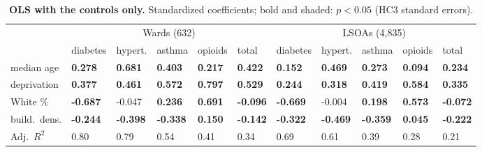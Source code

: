 \begin{table}[hbt!]
\caption{\textbf{OLS with the controls only.} Standardized coefficients; bold and shaded: $p<0.05$ (HC3 standard errors).}\label{ols_baseline}
\centering\footnotesize\setlength{\tabcolsep}{3pt}
\begin{tabular}{l*{10}{l}}
\toprule
 & \multicolumn{5}{c}{Wards (632)} & \multicolumn{5}{c}{LSOAs (4,835)} \\
\cmidrule(lr){2-6}\cmidrule(lr){7-11}
 & diabetes & hypert. & asthma & opioids & total & diabetes & hypert. & asthma & opioids & total \\
\midrule
median age & \cellcolor{poscell}\textbf{\phantom{-}0.278} & \cellcolor{poscell}\textbf{\phantom{-}0.681} & \cellcolor{poscell}\textbf{\phantom{-}0.403} & \cellcolor{poscell}\textbf{\phantom{-}0.217} & \cellcolor{poscell}\textbf{\phantom{-}0.422} & \cellcolor{poscell}\textbf{\phantom{-}0.152} & \cellcolor{poscell}\textbf{\phantom{-}0.469} & \cellcolor{poscell}\textbf{\phantom{-}0.273} & \cellcolor{poscell}\textbf{\phantom{-}0.094} & \cellcolor{poscell}\textbf{\phantom{-}0.234} \\
deprivation & \cellcolor{poscell}\textbf{\phantom{-}0.377} & \cellcolor{poscell}\textbf{\phantom{-}0.461} & \cellcolor{poscell}\textbf{\phantom{-}0.572} & \cellcolor{poscell}\textbf{\phantom{-}0.797} & \cellcolor{poscell}\textbf{\phantom{-}0.529} & \cellcolor{poscell}\textbf{\phantom{-}0.244} & \cellcolor{poscell}\textbf{\phantom{-}0.318} & \cellcolor{poscell}\textbf{\phantom{-}0.419} & \cellcolor{poscell}\textbf{\phantom{-}0.584} & \cellcolor{poscell}\textbf{\phantom{-}0.335} \\
White \% & \cellcolor{negcell}\textbf{-0.687} & -0.047 & \cellcolor{poscell}\textbf{\phantom{-}0.236} & \cellcolor{poscell}\textbf{\phantom{-}0.691} & \cellcolor{negcell}\textbf{-0.096} & \cellcolor{negcell}\textbf{-0.669} & -0.004 & \cellcolor{poscell}\textbf{\phantom{-}0.198} & \cellcolor{poscell}\textbf{\phantom{-}0.573} & \cellcolor{negcell}\textbf{-0.072} \\
build.\ dens. & \cellcolor{negcell}\textbf{-0.244} & \cellcolor{negcell}\textbf{-0.398} & \cellcolor{negcell}\textbf{-0.338} & \cellcolor{poscell}\textbf{\phantom{-}0.150} & \cellcolor{negcell}\textbf{-0.142} & \cellcolor{negcell}\textbf{-0.322} & \cellcolor{negcell}\textbf{-0.469} & \cellcolor{negcell}\textbf{-0.359} & \cellcolor{poscell}\textbf{\phantom{-}0.045} & \cellcolor{negcell}\textbf{-0.222} \\
\midrule
Adj.\ $R^2$ & 0.80 & 0.79 & 0.54 & 0.41 & 0.34 & 0.69 & 0.61 & 0.39 & 0.28 & 0.21 \\
\bottomrule
\end{tabular}
\end{table}

